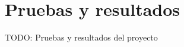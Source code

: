 \chapter{Pruebas y resultados\label{sec:pruebasYResultados}}

TODO: Pruebas y resultados del proyecto
